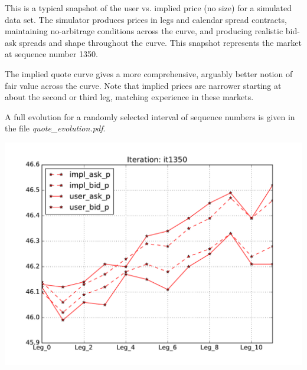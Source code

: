 \documentclass{article}
\begin{document}
This is a typical snapshot of the user vs. implied price (no size) for a simulated data set. The simulator produces prices in legs and calendar spread contracts, maintaining no-arbitrage conditions across the curve, and producing realistic bid-ask spreads and shape throughout the curve. This snapshot represents the market at sequence number 1350.


The implied quote curve gives a more comprehensive, arguably better notion of fair value across the curve. Note that implied prices are narrower starting at about the second or third leg, matching experience in these markets.


A full evolution for a randomly selected interval of sequence numbers is given in the file {\it quote{\_}evolution.pdf}.

\includegraphics[scale=.75]{quote_comp.pdf}
\end{document}
